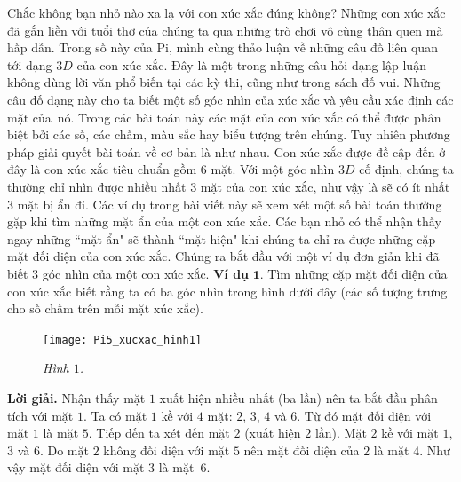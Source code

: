 \begin{multicols}{2}
	Chắc không bạn nhỏ nào xa lạ với con xúc xắc đúng không? Những con xúc xắc đã gắn liền với tuổi thơ của chúng ta qua những trò chơi vô cùng thân quen mà hấp dẫn. Trong số này của Pi, mình cùng thảo luận về những câu đố liên quan tới dạng $3D$ của con xúc xắc. Đây là một trong những câu hỏi dạng lập luận không dùng lời văn phổ biến tại các kỳ thi, cũng như trong sách đố vui. Những câu đố dạng này cho ta biết một số góc nhìn của xúc xắc và yêu cầu xác định các mặt của~nó.
	\vskip 0.1cm
	Trong các bài toán này các mặt của con xúc xắc có thể được phân biệt bởi các số, các chấm, màu sắc hay biểu tượng trên chúng. Tuy nhiên phương pháp giải quyết bài toán về cơ bản là như nhau.
	\vskip 0.1cm
	Con xúc xắc được đề cập đến ở đây là con xúc xắc tiêu chuẩn gồm $6$ mặt. Với một góc nhìn $3D$ cố định, chúng ta thường chỉ nhìn được nhiều nhất $3$ mặt của con xúc xắc, như vậy là sẽ có ít nhất $3$ mặt bị ẩn đi. Các ví dụ trong bài viết này sẽ xem xét một số bài toán thường gặp khi tìm những mặt ẩn của một con xúc xắc. Các bạn nhỏ có thể nhận thấy ngay những ``mặt ẩn" sẽ thành ``mặt hiện" khi chúng ta chỉ ra được những cặp mặt đối diện của con xúc xắc. 
	\vskip 0.1cm
	Chúng ra bắt đầu với một ví dụ đơn giản khi đã biết $3$ góc nhìn của một con xúc xắc. 
	\vskip 0.1cm
	\textbf{\color{toancuabi}Ví dụ} $\pmb{1.}$ Tìm những cặp mặt đối diện của con xúc xắc biết rằng ta có ba góc nhìn trong hình dưới đây (các số tượng trưng cho số chấm trên mỗi mặt xúc xắc).
	\begin{figure}[H]
		\vspace*{-5pt}
		\centering
		\captionsetup{labelformat= empty, justification=centering}
		\texttt{[image: Pi5\_xucxac\_hinh1]}
		\caption{\small\textit{\color{toancuabi}Hình $1$.}}
		\vspace*{-10pt}
	\end{figure}
	\textbf{\color{toancuabi}Lời giải.} Nhận thấy mặt $1$ xuất hiện nhiều nhất (ba lần) nên ta bắt đầu phân tích với mặt $1$. Ta có mặt $1$ kề với $4$ mặt: $2$, $3$, $4$ và $6$. Từ đó mặt đối diện với mặt $1$ là mặt $5$.
	\vskip 0.1cm
	Tiếp đến ta xét đến mặt $2$ (xuất hiện $2$ lần). Mặt $2$ kề với mặt $1$, $3$ và $6$. Do mặt $2$ không đối diện với mặt $5$ nên mặt đối diện của $2$ là mặt $4$. Như vậy mặt đối diện với mặt $3$ là mặt~$6$.
	\begin{table}[H]
		\vspace*{-5pt}
		\centering
		\setlength{\tabcolsep}{10pt}

\end{table}
\end{multicols}
